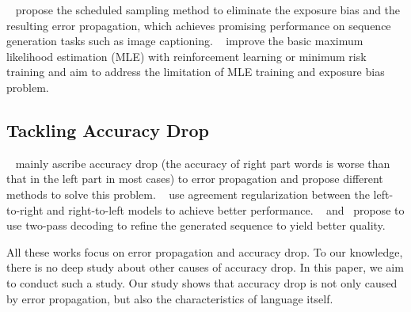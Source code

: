\documentclass[11pt,a4paper]{article}
\begin{document}
~\citet{DBLP:conf/nips/BengioVJS15} propose the scheduled sampling method to eliminate the exposure bias and the resulting error propagation, which achieves promising performance on sequence generation tasks such as image captioning. ~\citet{DBLP:conf/acl/ShenCHHWSL16,DBLP:journals/corr/RanzatoCAZ15} improve the basic maximum likelihood estimation (MLE) with reinforcement learning or minimum risk training and aim to address the limitation of MLE training and exposure bias problem.

\subsection{Tackling Accuracy Drop}

~\cite{DBLP:conf/naacl/LiuUFS16,DBLP:conf/aaai/LiuFUS16,DBLP:journals/corr/abs-1801-05122,DBLP:journals/corr/abs-1803-05567} mainly ascribe accuracy drop (the accuracy of right part words is worse than that in the left part in most cases) to error propagation and propose different methods to solve this problem. ~\citet{DBLP:conf/naacl/LiuUFS16,DBLP:conf/aaai/LiuFUS16,DBLP:journals/corr/abs-1803-05567} use agreement regularization between the left-to-right and right-to-left models to achieve better performance. ~\citet{DBLP:journals/corr/abs-1801-05122} and~\cite{DBLP:journals/corr/abs-1803-05567} propose to use two-pass decoding to refine the generated sequence to yield better quality.

All these works focus on error propagation and accuracy drop. To our knowledge, there is no deep study about other causes of accuracy drop. In this paper, we aim to conduct such a study. Our study shows that accuracy drop is not only caused by error propagation, but also the characteristics of language itself.




\end{document}
